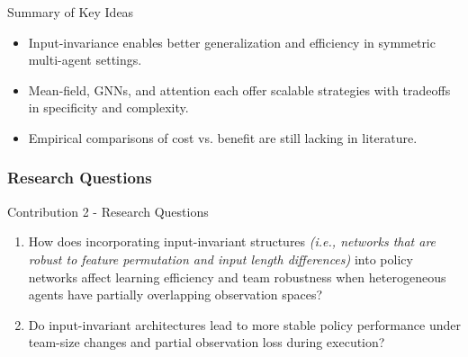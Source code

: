 \begin{frame}{Summary of Key Ideas}
\begin{itemize}
    \item Input-invariance enables better generalization and efficiency in symmetric multi-agent settings.
    \item Mean-field, GNNs, and attention each offer scalable strategies with tradeoffs in specificity and complexity.
    \item Empirical comparisons of cost vs. benefit are still lacking in literature.%
\end{itemize}
\end{frame}

\subsubsection{Research Questions}

\begin{frame}{Contribution 2 - Research Questions}
    \begin{enumerate}
        \item[RQ 1] {
            How does incorporating input-invariant structures \emph{(i.e., networks 
            that are robust to feature permutation and input length differences)}
            into policy networks affect learning efficiency and team robustness 
            when heterogeneous agents have partially overlapping observation spaces?
            }
        \item[RQ 2] {
            Do input-invariant architectures lead to more stable policy performance under 
            team-size changes and partial observation loss during execution?
            }
    \end{enumerate}
\end{frame}

